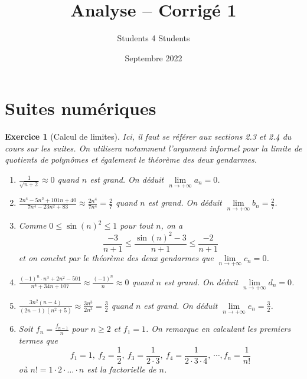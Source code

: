\documentclass[11.5pt,french,table]{article}
\title{Analyse -- Corrigé 1}
\author{Students 4 Students}
\date{Septembre 2022}
\theoremstyle{exercice}
\newtheorem{exercice}{Exercice}
\begin{document}
\maketitle

\part{Suites numériques}

\begin{exercice}[Calcul de limites]
Ici, il faut se référer aux sections 2.3 et 2.4 du cours sur les suites. On utilisera notamment l'argument informel pour la limite de quotients de polynômes et également le théorème des deux gendarmes.

\begin{enumerate}
\item $\displaystyle \frac{1}{\sqrt{n + 2}} \approx 0$ quand $n$ est grand. On déduit  $\displaystyle \lim \limits_{n \to +\infty} a_n = 0$.

\item $\displaystyle \frac{2n^4 - 5n^3 + 101n + 40}{7n^4 - 23n^2 + 83} \approx \frac{2n^4}{7n^4} = \frac{2}{7}$ quand $n$ est grand. On déduit  $\displaystyle \lim \limits_{n \to +\infty} b_n = \frac{2}{7}$.

\item Comme $0 \leq \sin(n)^2 \leq 1$ pour tout $n$, on a $$\frac{-3}{n+1} \leq \frac{\sin(n)^2 - 3}{n + 1} \leq \frac{-2}{n+1}$$
et on conclut par le théorème des deux gendarmes que  $\displaystyle \lim \limits_{n \to +\infty} c_n = 0$.

\item $\displaystyle \frac{(-1)^n \cdot n^3 + 2n^2 - 501}{n^4 + 34n + 107} \approx \frac{(-1)^n}{n} \approx 0$ quand $n$ est grand.  On déduit  $\displaystyle \lim \limits_{n \to +\infty} d_n = 0$.

\item $\displaystyle \frac{3n^2(n-4)}{(2n-1)(n^2+5)} \approx \frac{3n^3}{2n^3} = \frac{3}{2}$ quand $n$ est grand. On déduit $\displaystyle \lim \limits_{n \to +\infty} e_n = \frac{3}{2}$.

\item Soit $\displaystyle f_n = \frac{f_{n-1}}{n}$ pour $n \geq 2$ et $f_1 = 1$. On remarque en calculant les premiers termes que 
$$f_1 = 1, \ f_2 = \frac{1}{2}, \ f_3 = \frac{1}{2 \cdot 3}, \ f_4 = \frac{1}{2 \cdot 3 \cdot 4}, \ \cdots, f_n = \frac{1}{n!}$$
où $n! = 1 \cdot 2 \cdot \ldots \cdot n$ est la \emph{factorielle} de $n$.


\end{enumerate}
\end{exercice}
\end{document}
